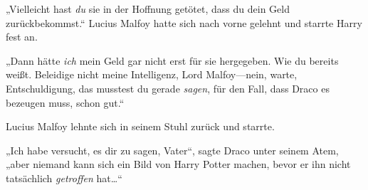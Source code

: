 „Vielleicht hast \emph{du} sie in der Hoffnung getötet, dass du dein Geld zurückbekommst.“ Lucius Malfoy hatte sich nach vorne gelehnt und starrte Harry fest an.

„Dann hätte \emph{ich} mein Geld gar nicht erst für sie hergegeben. Wie du bereits weißt. Beleidige nicht meine Intelligenz, Lord Malfoy—nein, warte, Entschuldigung, das musstest du gerade \emph{sagen}, für den Fall, dass Draco es bezeugen muss, schon gut.“

Lucius Malfoy lehnte sich in seinem Stuhl zurück und starrte.

„Ich habe versucht, es dir zu sagen, Vater“, sagte Draco unter seinem Atem, „aber niemand kann sich ein Bild von Harry Potter machen, bevor er ihn nicht tatsächlich \emph{getroffen} hat…“

